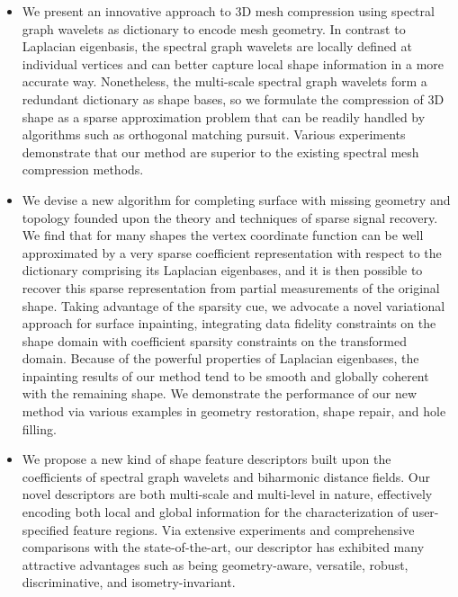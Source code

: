 \begin{itemize}
\item We present an innovative approach to 3D mesh compression using spectral graph
wavelets as dictionary to encode mesh geometry. In contrast to
Laplacian eigenbasis, the spectral graph wavelets are locally
defined at individual vertices and can better capture local shape
information in a more accurate way. Nonetheless, the multi-scale
spectral graph wavelets form a redundant dictionary as shape bases,
so we formulate the compression of 3D shape as a sparse
approximation problem that can be readily handled by
algorithms such as orthogonal matching pursuit. Various experiments
demonstrate that our method are superior to the existing spectral
mesh compression methods.

\item  We devise a new algorithm for completing surface with
  missing geometry and topology founded upon the theory and techniques
  of sparse signal recovery. We find that for many shapes the vertex coordinate function
  can be well approximated by a very sparse coefficient representation with respect
  to the dictionary comprising its Laplacian eigenbases, and it is then possible to
  recover this sparse representation from partial measurements of the original shape.
  Taking advantage of the sparsity cue, we advocate a novel
  variational approach for surface inpainting, integrating data
  fidelity constraints on the shape domain with coefficient sparsity
  constraints on the transformed domain. Because of the powerful
  properties of Laplacian eigenbases, the inpainting results of our
  method tend to be smooth and globally coherent with the remaining
  shape. We demonstrate the performance of our new method via various
  examples in geometry restoration, shape repair, and hole filling.

\item We propose a new kind of shape feature descriptors built upon the
  coefficients of spectral graph wavelets and biharmonic distance fields.
  Our novel descriptors are both multi-scale and multi-level in nature,
  effectively encoding both local and global information
  for the characterization of user-specified feature regions.
  Via extensive experiments and comprehensive comparisons with the state-of-the-art,
  our descriptor has exhibited many attractive advantages such as being geometry-aware,
  versatile, robust, discriminative, and isometry-invariant.


\end{itemize}
